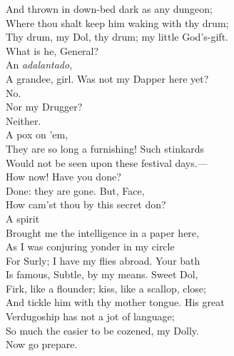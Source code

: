 \documentclass[a4paper,oneside,12pt]{memoir}
\begin{document}
\begin{drama*}
And thrown in down-bed dark as any dungeon;\\
Where thou shalt keep him waking with thy drum;\\
Thy drum, my Dol, thy drum; my little God's-gift.\\
\dolspeaks What is he, General?\\
\facespeaks {} An \emph{adalantado},\\
A grandee, girl. Was not my Dapper here yet?\\
\dolspeaks No.\\
\facespeaks {} Nor my Drugger?\\
\dolspeaks {} Neither.\\
\facespeaks {} A pox on 'em,\\
They are so long a furnishing! Such stinkards\\
Would not be seen upon these festival days.---\\
How now! Have you done?\\
\subtlespeaks {} Done: they are gone. But, Face,\\
How cam'st thou by this secret don?\\
\facespeaks {} A spirit\\
Brought me the intelligence in a paper here,\\
As I was conjuring yonder in my circle\\
For Surly; I have my flies abroad. Your bath\\
Is famous, Subtle, by my means. Sweet Dol,\\
Firk, like a flounder; kiss, like a scallop, close;\\
And tickle him with thy mother tongue. His great\\
Verdugoship has not a jot of language;\\
So much the easier to be cozened, my Dolly.\\
Now go prepare.

\scene


\end{drama*}
\end{document}
